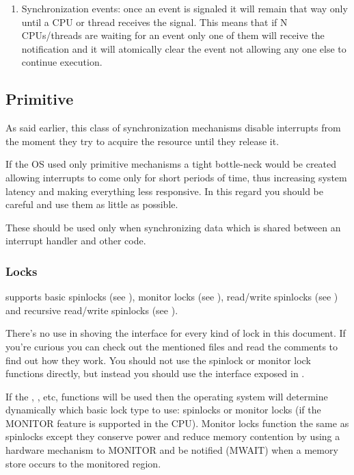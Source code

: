 \begin{appendices}
\begin{enumerate}
	\item Synchronization events: once an event is signaled it will remain that way only until a
CPU or thread receives the signal. This means that if N CPUs/threads are waiting for an event only
one of them will receive the notification and it will atomically clear the event not allowing any
one else to continue execution.
\end{enumerate}

\subsection{Primitive}
\label{sect:PrimSynch}

As said earlier, this class of synchronization mechanisms disable interrupts from the moment they
try to acquire the resource until they release it.

If the OS used only primitive mechanisms a tight bottle-neck would be created allowing interrupts to
come only for short periods of time, thus increasing system latency and making everything less
responsive. In this regard you should be careful and use them as little as possible.

These should be used only when synchronizing data which is shared between an interrupt handler and
other code.

\subsubsection{Locks}

\projectname supports basic spinlocks (see ), monitor locks (see ),
read/write spinlocks (see ) and recursive read/write spinlocks
(see ).

There's no use in shoving the interface for every kind of lock in this document. If you're curious 
you can check out the mentioned files and read the comments to find out how they work. You should
 not use the spinlock or monitor lock functions directly, but instead you should use the interface
 exposed in .

If the , , etc, functions will be used then the operating system
will determine dynamically which basic lock type to use: spinlocks or monitor locks (if the MONITOR
feature is supported in the CPU). Monitor locks function the same as spinlocks except they conserve
power and reduce memory contention by using a hardware mechanism to MONITOR and be notified (MWAIT)
when a memory store occurs to the monitored region.


\end{appendices}

